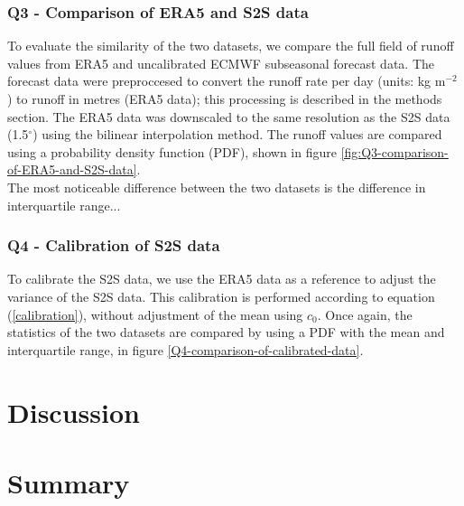\documentclass[11pt]{article}
\begin{document}
\subsubsection*{Q3 - Comparison of ERA5 and S2S data}

To evaluate the similarity of the two datasets, we compare the full field of runoff values from ERA5 and uncalibrated ECMWF subseasonal forecast data. The forecast data were preproccesed to convert the runoff rate per day (units: kg m$^{-2}$) to runoff in metres (ERA5 data); this processing is described in the methods section. The ERA5 data was downscaled to the same resolution as the S2S data (1.5$^{\circ}$) using the bilinear interpolation method. The runoff values are compared using a probability density function (PDF), shown in figure \ref*{fig:Q3-comparison-of-ERA5-and-S2S-data}.\\


The most noticeable difference between the two datasets is the difference in interquartile range...

\subsubsection*{Q4 - Calibration of S2S data}

To calibrate the S2S data, we use the ERA5 data as a reference to adjust the variance of the S2S data. This calibration is performed according to equation (\ref{calibration}), without adjustment of the mean using $c_0$. Once again, the statistics of the two datasets are compared by using a PDF with the mean and interquartile range, in figure \ref*{Q4-comparison-of-calibrated-data}. \\



\section*{Discussion}

\section*{Summary}



\printbibliography
\end{document}
